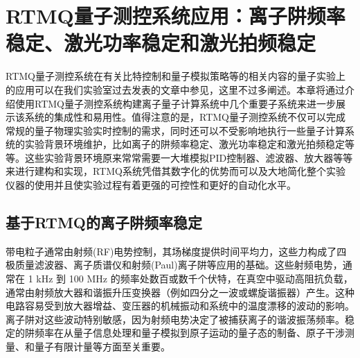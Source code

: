 

\chapter[RTMQ测控系统应用：离子阱频率稳定、激光功率稳定和激光拍频稳定]{RTMQ量子测控系统应用：离子阱频率稳定、激光功率稳定和激光拍频稳定\label{section:implementation}}
RTMQ量子测控系统在有关比特控制和量子模拟策略等的相关内容的量子实验上的应用可以在我们实验室过去发表的文章\cite[]{Zhang_Wang_Wang_Zhang_Wu_Jie_Lu_2022}中参见，这里不过多阐述。本章将通过介绍使用RTMQ量子测控系统构建离子量子计算系统中几个重要子系统来进一步展示该系统的集成性和易用性。值得注意的是，RTMQ量子测控系统不仅可以完成常规的量子物理实验实时控制的需求，同时还可以不受影响地执行一些量子计算系统的实验背景环境维护，比如离子的阱频率稳定、激光功率稳定和激光拍频稳定等等。这些实验背景环境原来常常需要一大堆模拟PID控制器、滤波器、放大器等等来进行建构和实现，RTMQ系统凭借其数字化的优势而可以及大地简化整个实验仪器的使用并且使实验过程有着更强的可控性和更好的自动化水平。

\section[基于RTMQ的离子阱频率稳定]{基于RTMQ的离子阱频率稳定\label{section:trap_frequency_stablization}}

带电粒子通常由射频(RF)电势控制，其场梯度提供时间平均力，这些力构成了四极质量滤波器、离子质谱仪和射频(Paul)离子阱等应用的基础\cite[]{Dehmelt_1990, Paul_1990}。这些射频电势，通常在 1 kHz 到 100 MHz 的频率处数百或数千个伏特，在真空中驱动高阻抗负载，通常由射频放大器和谐振升压变换器（例如四分之一波或螺旋谐振器）产生\cite[]{Siverns_Simkins_Weidt_Hensinger_2012}。这种电路容易受到放大器增益、变压器的机械振动和系统中的温度漂移的波动的影响。离子阱对这些波动特别敏感，因为射频电势决定了被捕获离子的谐波振荡频率。稳定的阱频率在从量子信息处理\cite[]{Blatt_Wineland_2008, Monroe_Kim_2013}和量子模拟\cite[]{Richerme_Gong_Lee_Senko_Smith_Foss_Feig_Michalakis_Gorshkov_Monroe_2014, Jurcevic_Lanyon_Hauke_Hempel_Zoller_Blatt_Roos_2014}到原子运动的量子态的制备\cite[]{Leibfried_Blatt_Monroe_Wineland_2003}、原子干涉测量\cite[]{Johnson_Neyenhuis_Mizrahi_Wong_Campos_Monroe_2015}、和量子有限计量\cite[]{Chou_Hume_Koelemeij_Wineland_Rosenband_2010}等方面至关重要。


